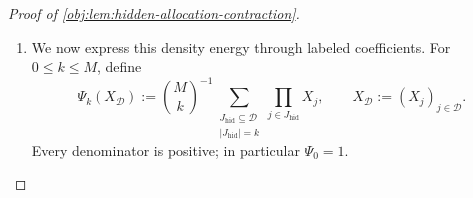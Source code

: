 \documentclass[11pt]{article}
\begin{document}
\begin{proof}[Proof of \cref{obj:lem:hidden-allocation-contraction}]
\begin{enumerate}
Expanding the coefficient-extraction formula in
\cref{obj:lem:block-law} and applying this count gives the exact identity
\[
\lambda_{+1,h}(y\mid H,z)
=
\frac1{|\mathfrak C_H|}
\sum_{(\mathcal D_\ell)\in\mathfrak C_H}
\prod_{\ell=1}^B
f\left(
y_\ell-\frac h{2d}
\left(A_\ell(z)+\sum_{j\in\mathcal D_\ell}X_j(z)\right)
\right).
\]
Thus the conditional density is the uniform-completion average of the original labeled row densities.

If \(g_d(y_\ell)=0\), every translated density contributing to its nonnegative finite mixture is zero. The last display then gives
\(\lambda_{+1,h}(y\mid H,z)=0\). Consequently a version of the likelihood is
\[
L_+(z,y)
=
\begin{cases}
\displaystyle
\frac{\lambda_{+1,h}(y\mid H,z)}
{\prod_{\ell=1}^B g_d(y_\ell)},
&\prod_{\ell=1}^B g_d(y_\ell)>0,\\[6pt]
0,&\prod_{\ell=1}^B g_d(y_\ell)=0.
\end{cases}
\]
The response reference assigns full measure to the first case. The conditional density identification and the product form of \(Q_H\) therefore yield
\[
\chi_H^2
=
\int_{\mathbb R^B}
\int_{\{0,1\}^V}
\bigl(L_+(z,y)-1\bigr)^2
\,\mu_{\mathrm{ass}}(dz)\,\nu_{\mathrm{resp}}(dy).
\]
Finite channel expansions are bounded, so the integral rearrangements below are justified. Multiplying this identity by the remaining-capacity indicator preserves it almost surely under the actual graph marginal.

\item We now express this density energy through labeled coefficients. For
\(0\le k\le M\), define
\[
\Psi_k(X_{\mathcal D})
:=
\binom Mk^{-1}
\sum_{\substack{J_{\mathrm{hid}}\subseteq\mathcal D\\
|J_{\mathrm{hid}}|=k}}
\prod_{j\in J_{\mathrm{hid}}}X_j,
\qquad
X_{\mathcal D}:=(X_j)_{j\in\mathcal D}.
\]
Every denominator is positive; in particular \(\Psi_0=1\).


\end{enumerate}
\end{proof}
\end{document}
